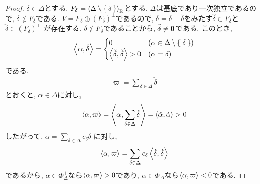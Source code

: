 \begin{proof}
  $\delta\in\Delta$とする.
  $F_\delta=\Braket{\Delta\setminus\Set{\delta}}_{\mathbb{R}}$とする.
  $\Delta$は基底であり一次独立であるので,
  $\delta\not\in F_\delta$である.
  $V=F_\delta\oplus (F_\delta)^\perp$であるので,
  $\delta=\hat\delta+\check\delta$をみたす$\hat\delta\in F_\delta$と$\check\delta\in (F_\delta)^\perp$
  が存在する.
  $\delta\not\in F_\delta$であることから,
  $\check\delta \neq\boldsymbol{0}$である.
  このとき,
  \begin{align*}
    \Braket{\alpha,\check\delta}
    =
    \begin{cases}
      0 & (\alpha\in \Delta\setminus\Set{\delta})\\
      \Braket{\check\delta,\check\delta}>0 & (\alpha=\delta)
    \end{cases}
  \end{align*}
  である.
  \begin{align*}
    \varpi=\sum_{\delta\in\Delta}\check\delta
  \end{align*}
  とおくと, $\alpha\in\Delta$に対し,
  \begin{align*}
    \Braket{\alpha,\varpi}
    =\Braket{\alpha,\sum_{\delta\in\Delta}\check\delta}
    =\Braket{\check\alpha,\check\alpha}>0
  \end{align*}
  したがって, $\alpha=\sum_{\delta\in \Delta}c_\delta \delta$
  に対し,
  \begin{align*}
    \Braket{\alpha,\varpi}=\sum_{\delta\in\Delta} c_\delta\Braket{\check\delta,\check\delta}
  \end{align*}
  であるから,
  $\alpha\in \Phi_\Delta^+$なら$\Braket{\alpha,\varpi}>0$であり,
  $\alpha\in \Phi_\Delta^-$なら$\Braket{\alpha,\varpi}<0$である.
\end{proof}

